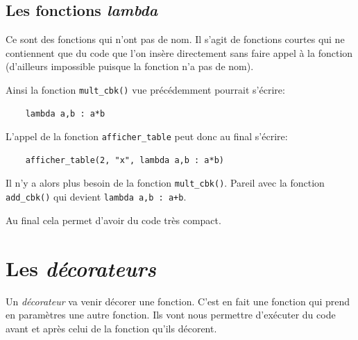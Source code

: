 \documentclass[a4paper,12pt]{book}
\begin{document}
\subsection*{Les fonctions \textit{lambda}}
Ce sont des fonctions qui n'ont pas de nom. Il s'agit de fonctions courtes qui ne contiennent que du code que l'on insère directement sans faire appel à la fonction (d'ailleurs impossible puisque la fonction n'a pas de nom).
\medskip

Ainsi la fonction \verb|mult_cbk()| vue précédemment pourrait s'écrire:
\begin{verbatim}
    lambda a,b : a*b
\end{verbatim}
\medskip

L'appel de la fonction \texttt{afficher\_table} peut donc au final s'écrire:
\begin{verbatim}
    afficher_table(2, "x", lambda a,b : a*b)
\end{verbatim}
\medskip

Il n'y a alors plus besoin de la fonction \texttt{mult\_cbk()}. Pareil avec la fonction \texttt{add\_cbk()} qui devient \texttt{lambda a,b : a+b}.
\medskip

Au final cela permet d'avoir du code très compact.
\medskip

\section{Les \textit{décorateurs}}
Un \textit{décorateur} va venir décorer une fonction. C'est en fait une fonction qui prend en paramètres une autre fonction. Ils vont nous permettre d'exécuter du code avant et après celui de la fonction qu'ils décorent.
\medskip
\end{document}
